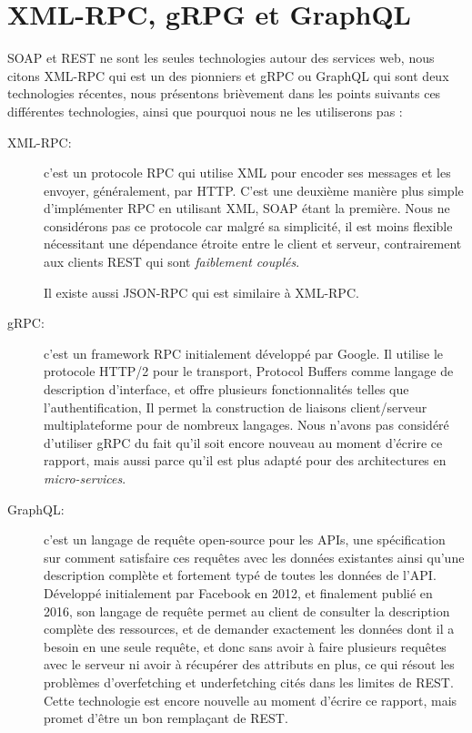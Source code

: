 \section{XML-RPC, gRPG et GraphQL}
SOAP et REST ne sont les seules technologies autour des services web, nous citons XML-RPC qui est un des pionniers et gRPC ou GraphQL qui sont deux technologies récentes, nous présentons brièvement dans les points suivants ces différentes technologies, ainsi que pourquoi nous ne les utiliserons pas :
\begin{description}
\item[XML-RPC:] c'est un protocole RPC
qui utilise XML pour encoder ses messages et les envoyer, généralement, par HTTP.
C'est une deuxième manière plus simple d'implémenter RPC en utilisant XML, SOAP étant la première. Nous ne considérons pas ce protocole car malgré sa simplicité, il est moins flexible nécessitant une dépendance étroite entre le client et serveur, contrairement aux clients REST qui sont \emph{faiblement couplés}.

Il existe aussi JSON-RPC qui est similaire à XML-RPC.

\item[gRPC: ] c'est un framework RPC initialement développé par Google. Il utilise le protocole HTTP/2 pour le transport, Protocol Buffers comme langage de description d'interface, et offre plusieurs fonctionnalités telles que l'authentification, Il permet la construction de liaisons client/serveur multiplateforme pour de nombreux langages.
Nous n'avons pas considéré d'utiliser gRPC du fait qu'il soit encore nouveau au moment d'écrire ce rapport, mais aussi parce qu'il est plus adapté pour des architectures en \emph{micro-services}.

\item[GraphQL:] c'est un langage de requête open-source pour les APIs, une spécification sur comment satisfaire ces requêtes avec les données existantes ainsi qu'une description complète et fortement typé de toutes les données de l'API.
Développé initialement par Facebook en 2012, et finalement publié en 2016, son langage de requête permet au client de consulter la description complète des ressources, et de demander exactement les données dont il a besoin en une seule requête, et donc sans avoir à faire plusieurs requêtes avec le serveur ni avoir à récupérer des attributs en plus, ce qui résout les problèmes d'overfetching et underfetching cités dans les limites de REST.
Cette technologie est encore nouvelle au moment d'écrire ce rapport, mais promet d'être un bon remplaçant de REST.



\end{description}
